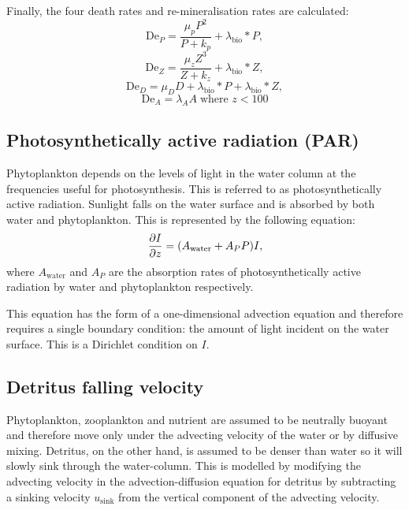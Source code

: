 Finally, the four death rates and re-mineralisation rates are calculated:
\begin{equation}
    \mathrm{De}_P = \frac{\mu_pP^2}{P+k_p} + \lambda_{\mathrm{bio}}*P\label{eq:bio6_dp},
\end{equation}
\begin{equation}
    \mathrm{De}_Z = \frac{\mu_zZ^3}{Z+k_z} + \lambda_{\mathrm{bio}}*Z\label{eq:bio6_dz},
\end{equation}
\begin{equation}
    \mathrm{De}_D = \mu_DD+\lambda_{\mathrm{bio}}*P + \lambda_{\mathrm{bio}}*Z\label{eq:bio6_dd},
\end{equation}
\begin{equation}
    \mathrm{De}_A = \lambda_A A \; \mbox{where $z < 100$}\label{eq:bio6_da}
\end{equation}


\subsection{Photosynthetically active radiation (PAR)}\label{sec:I}

Phytoplankton depends on the levels of light in the water column at the
frequencies useful for photosynthesis. This is referred to as
photosynthetically active radiation. Sunlight falls on the water surface and
is absorbed by both water and phytoplankton. This is represented by the
following equation:
\begin{equation}
  \ppx[z]{I}=(A_{\mathrm{water}}+A_PP)I,
\end{equation}
where $A_{\mathrm{water}}$ and $A_P$ are the absorption rates of
photosynthetically active radiation by water and phytoplankton respectively.

This equation has the form of a one-dimensional advection equation and
therefore requires a single boundary condition: the amount of light incident
on the water surface. This is a Dirichlet condition on $I$.

\subsection{Detritus falling velocity}\label{sec:detritus}

Phytoplankton, zooplankton and nutrient are assumed to be neutrally buoyant
and therefore move only under the advecting velocity of the water or by
diffusive mixing. Detritus, on the other hand, is assumed to be denser than
water so it will slowly sink through the water-column. This is modelled by
modifying the advecting velocity in the advection-diffusion equation for
detritus by subtracting a sinking velocity $u_{\mathrm{sink}}$ from the
vertical component of the advecting velocity.

